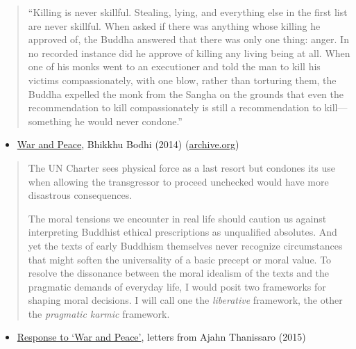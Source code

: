 \begin{quote}
``Killing is never skillful. Stealing, lying, and everything else in the
first list are never skillful. When asked if there was anything whose
killing he approved of, the Buddha answered that there was only one
thing: anger. In no recorded instance did he approve of killing any
living being at all. When one of his monks went to an executioner and
told the man to kill his victims compassionately, with one blow, rather
than torturing them, the Buddha expelled the monk from the Sangha on the
grounds that even the recommendation to kill compassionately is still a
recommendation to kill---something he would never condone.''
\end{quote}

\begin{itemize}
\tightlist
\item
  \href{https://www.inquiringmind.com/article/3002_5_bhodi-war-and-peace-a-buddhist-perspective/}{War
  and Peace}, Bhikkhu Bodhi (2014)
  (\href{https://web.archive.org/web/20151122005139/http://www.inquiringmind.com/Articles/WarAndPeace.html}{archive.org})
\end{itemize}

\begin{quote}
The UN Charter sees physical force as a last resort but condones its use
when allowing the transgressor to proceed unchecked would have more
disastrous consequences.

The moral tensions we encounter in real life should caution us against
interpreting Buddhist ethical prescriptions as unqualified absolutes.
And yet the texts of early Buddhism themselves never recognize
circumstances that might soften the universality of a basic precept or
moral value. To resolve the dissonance between the moral idealism of the
texts and the pragmatic demands of everyday life, I would posit two
frameworks for shaping moral decisions. I will call one the
\emph{liberative} framework, the other the \emph{pragmatic karmic}
framework.
\end{quote}

\begin{itemize}
\tightlist
\item
  \href{https://web.archive.org/web/20151123015056/http://www.inquiringmind.com/Articles/BhikkhuLetters.html}{Response
  to `War and Peace'}, letters from Ajahn Thanissaro (2015)
\end{itemize}

